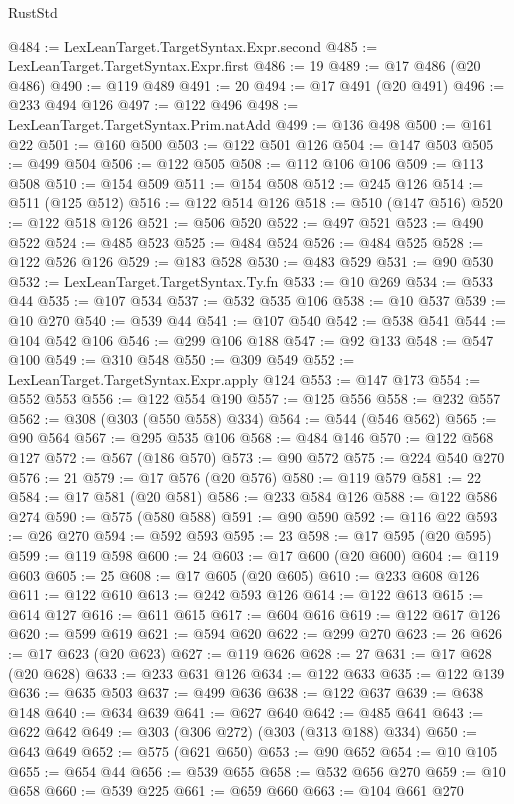 \begin{lexlean}{RustStd}
\begin{coremodule}
@484 := LexLeanTarget.TargetSyntax.Expr.second
@485 := LexLeanTarget.TargetSyntax.Expr.first
@486 := 19
@489 := @17 @486 (@20 @486)
@490 := @119 @489
@491 := 20
@494 := @17 @491 (@20 @491)
@496 := @233 @494 @126
@497 := @122 @496
@498 := LexLeanTarget.TargetSyntax.Prim.natAdd
@499 := @136 @498
@500 := @161 @22
@501 := @160 @500
@503 := @122 @501 @126
@504 := @147 @503
@505 := @499 @504
@506 := @122 @505
@508 := @112 @106 @106
@509 := @113 @508
@510 := @154 @509
@511 := @154 @508
@512 := @245 @126
@514 := @511 (@125 @512)
@516 := @122 @514 @126
@518 := @510 (@147 @516)
@520 := @122 @518 @126
@521 := @506 @520
@522 := @497 @521
@523 := @490 @522
@524 := @485 @523
@525 := @484 @524
@526 := @484 @525
@528 := @122 @526 @126
@529 := @183 @528
@530 := @483 @529
@531 := @90 @530
@532 := LexLeanTarget.TargetSyntax.Ty.fn
@533 := @10 @269
@534 := @533 @44
@535 := @107 @534
@537 := @532 @535 @106
@538 := @10 @537
@539 := @10 @270
@540 := @539 @44
@541 := @107 @540
@542 := @538 @541
@544 := @104 @542 @106
@546 := @299 @106 @188
@547 := @92 @133
@548 := @547 @100
@549 := @310 @548
@550 := @309 @549
@552 := LexLeanTarget.TargetSyntax.Expr.apply @124
@553 := @147 @173
@554 := @552 @553
@556 := @122 @554 @190
@557 := @125 @556
@558 := @232 @557
@562 := @308 (@303 (@550 @558) @334)
@564 := @544 (@546 @562)
@565 := @90 @564
@567 := @295 @535 @106
@568 := @484 @146
@570 := @122 @568 @127
@572 := @567 (@186 @570)
@573 := @90 @572
@575 := @224 @540 @270
@576 := 21
@579 := @17 @576 (@20 @576)
@580 := @119 @579
@581 := 22
@584 := @17 @581 (@20 @581)
@586 := @233 @584 @126
@588 := @122 @586 @274
@590 := @575 (@580 @588)
@591 := @90 @590
@592 := @116 @22
@593 := @26 @270
@594 := @592 @593
@595 := 23
@598 := @17 @595 (@20 @595)
@599 := @119 @598
@600 := 24
@603 := @17 @600 (@20 @600)
@604 := @119 @603
@605 := 25
@608 := @17 @605 (@20 @605)
@610 := @233 @608 @126
@611 := @122 @610
@613 := @242 @593 @126
@614 := @122 @613
@615 := @614 @127
@616 := @611 @615
@617 := @604 @616
@619 := @122 @617 @126
@620 := @599 @619
@621 := @594 @620
@622 := @299 @270
@623 := 26
@626 := @17 @623 (@20 @623)
@627 := @119 @626
@628 := 27
@631 := @17 @628 (@20 @628)
@633 := @233 @631 @126
@634 := @122 @633
@635 := @122 @139
@636 := @635 @503
@637 := @499 @636
@638 := @122 @637
@639 := @638 @148
@640 := @634 @639
@641 := @627 @640
@642 := @485 @641
@643 := @622 @642
@649 := @303 (@306 @272) (@303 (@313 @188) @334)
@650 := @643 @649
@652 := @575 (@621 @650)
@653 := @90 @652
@654 := @10 @105
@655 := @654 @44
@656 := @539 @655
@658 := @532 @656 @270
@659 := @10 @658
@660 := @539 @225
@661 := @659 @660
@663 := @104 @661 @270

\end{coremodule}
\end{lexlean}
